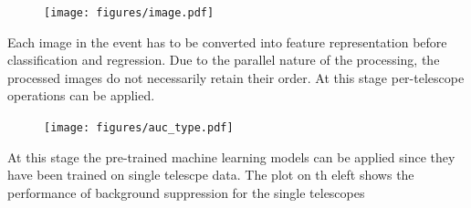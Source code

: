 \begin{multicols}{2}
\begin{center}
        \begin{streamblock}[equal height group=C, width=0.8\linewidth]{0mm}{-5mm}{}%
          \begin{multicols}{2}
            \begin{figure}
              \texttt{[image: figures/image.pdf]}
            \end{figure}

            \columnbreak
            Each image in the event has to be converted into feature representation before classification and regression.
            Due to the parallel nature of the processing, the processed images do not necessarily retain their order.
            At this stage per-telescope operations can be applied.

          \end{multicols}
        \end{streamblock}%

        \begin{streamblock}[equal height group=C, width=0.8\linewidth]{-5mm}{-5mm}{}%
          \begin{multicols}{2}
            \begin{figure}
              \texttt{[image: figures/auc\_type.pdf]}
            \end{figure}
            \columnbreak

            At this stage the pre-trained machine learning models can be applied since they
            have been trained on single telescpe data. The plot on th eleft shows the performance
            of background suppression for the single telescopes

          \end{multicols}
        \end{streamblock}%



\end{center}
\end{multicols}

